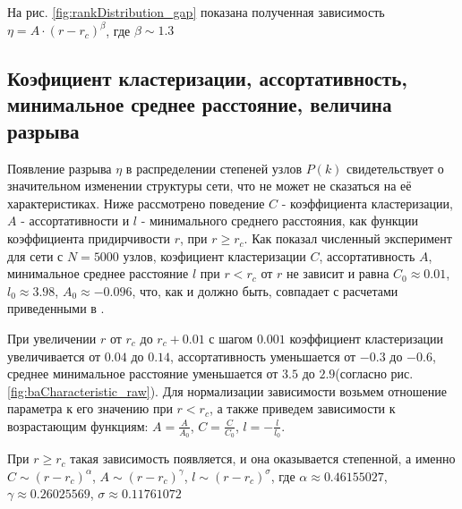\documentclass[10pt,aps,pra]{revtex4-1}
\begin{document}
На рис. \ref{fig:rankDistribution_gap} показана полученная зависимость $\eta = A \cdot {(r-r_c)}^\beta$, где $\beta \sim 1.3$

\subsection{Коэфициент кластеризации, ассортативность, минимальное среднее расстояние, величина разрыва}
Появление разрыва $\eta$ в распределении степеней узлов $P(k)$ свидетельствует о значительном изменении структуры сети, что не может не сказаться на её характеристиках. Ниже рассмотрено поведение $C$ - коэффициента кластеризации, $A$ - ассортативности и $l$ - минимального среднего расстояния, как функции коэффициента придирчивости $r$, при $r \geq r_c$. Как показал численный эксперимент для сети с $N=5000$ узлов, коэфициент кластеризации $C$, ассортативность $A$, минимальное среднее расстояние $l$ при $r<r_c$ от $r$ не зависит и равна $C_0 \approx 0.01$, $l_0 \approx 3.98$, $A_0 \approx -0.096$, что, как и должно быть, совпадает с расчетами приведенными в \cite{AlBa2,Newman2}. 

При увеличении $r$ от $r_c$ до $r_c + 0.01$ с шагом $0.001$ коэффициент кластеризации увеличивается от $0.04$ до $0.14$, ассортативность уменьшается от $-0.3$ до $-0.6$, среднее минимальное расстояние уменьшается от $3.5$ до $2.9$(согласно рис. \ref{fig:baCharacteristic_raw}). Для нормализации зависимости возьмем отношение параметра к его значению при $r<r_c$, а также приведем зависимости к возрастающим функциям: $A=\frac{A}{A_0}$, $C=\frac{C}{C_0}$, $l=-\frac{l}{l_0}$.

При $r \geq r_c$ такая зависимость появляется, и она оказывается степенной, а именно $C \sim {(r-r_c)}^\alpha$, $A \sim {(r-r_c)}^\gamma$, $l \sim {(r-r_c)}^\sigma$, где $\alpha \approx 0.46155027$, $\gamma \approx 0.26025569$, $\sigma \approx 0.11761072$
\end{document}
